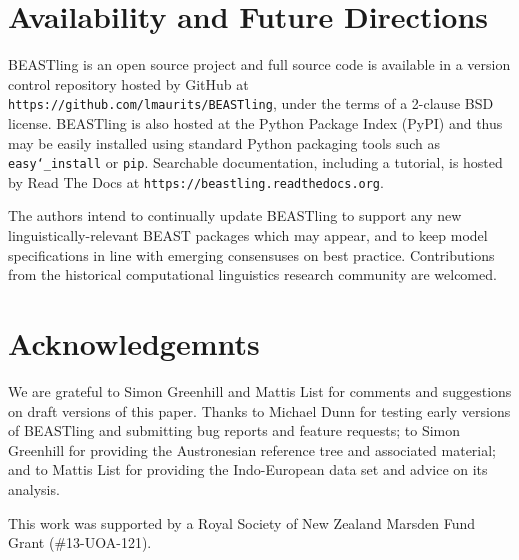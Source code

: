 \documentclass[twocolumn,10pt]{scrartcl}
\begin{document}
\section{Availability and Future Directions}

BEASTling is an open source project and full source code is available in a version control repository hosted by GitHub at \texttt{https://github.com/lmaurits/BEASTling}, under the terms of a 2-clause BSD license.  BEASTling is also hosted at the Python Package Index (PyPI) and thus may be easily installed using standard Python packaging tools such as \texttt{easy\char`_install} or \texttt{pip}.  Searchable documentation, including a tutorial, is hosted by Read The Docs at \texttt{https://beastling.readthedocs.org}.

The authors intend to continually update BEASTling to support any new linguistically-relevant BEAST packages which may appear, and to keep model specifications in line with emerging consensuses on best practice.  Contributions from the historical computational linguistics research community are welcomed.

\section{Acknowledgemnts}

We are grateful to Simon Greenhill and Mattis List for comments and suggestions on draft versions of this paper.  Thanks to Michael Dunn for testing early versions of BEASTling and submitting bug reports and feature requests; to Simon Greenhill for providing the Austronesian reference tree and associated material; and to Mattis List for providing the Indo-European data set and advice on its analysis.

This work was supported by a Royal Society of New Zealand Marsden Fund Grant (\#13-UOA-121).




\end{document}
